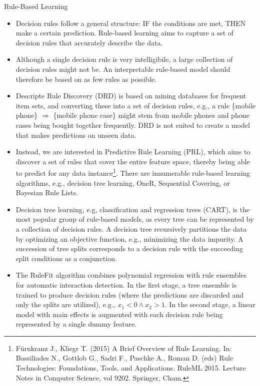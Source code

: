\documentclass[11pt,compress,t,notes=noshow, xcolor=table]{beamer}
\begin{document}
\begin{vbframe}{Rule-Based Learning}

\begin{itemize}
\setlength\itemsep{2em}
\item 
Decision rules follow a general structure: IF the conditions are met, THEN make a certain prediction. Rule-based learning aims to capture a set of decision rules that accurately describe the data. 
\item Although a single decision rule is very intelligibile, a large collection of decision rules might not be. An interpretable rule-based model should therefore be based on as few rules as possible.
\item Descripte Rule Discovery (DRD) is based on mining databases for frequent item sets, and converting these into a set of decision rules, e.g., a rule \{mobile phone\} $\Rightarrow$ \{mobile phone case\} might stem from mobile phones and phone cases being bought together frequently. DRD is not suited to create a model that makes predictions on unseen data.
\item Instead, we are interested in Predictive Rule Learning (PRL), which aims to discover a set of rules that cover the entire feature space, thereby being able to predict for any data instance\footnote[frame]{Fürnkranz J., Kliegr T. (2015) A Brief Overview of Rule Learning. In: Bassiliades N., Gottlob G., Sadri F., Paschke A., Roman D. (eds) Rule Technologies: Foundations, Tools, and Applications. RuleML 2015. Lecture Notes in Computer Science, vol 9202. Springer, Cham.}. There are innumerable rule-based learning algorithms, e.g., decision tree learning, OneR, Sequential Covering, or Bayesian Rule Lists.
\item Decision tree learning, e.g, classification and regression trees (CART), is the most popular group of rule-based models, as every tree can be represented by a collection of decision rules. A decision tree recursively partitions the data by optimizing an objective function, e.g., minimizing the data impurity. A succession of tree splits corresponds to a decision rule with the succeeding split conditions as a conjunction.
\item The RuleFit algorithm combines polynomial regression with rule ensembles for automatic interaction detection. In the first stage, a tree ensemble is trained to produce decision rules (where the predictions are discarded and only the splits are utilized), e.g., $x_1 < 0 \land x_2 > 1$. In the second stage, a linear model with main effects is augmented with each decision rule being represented by a single dummy feature.

\end{itemize}
\end{vbframe}
\end{document}
